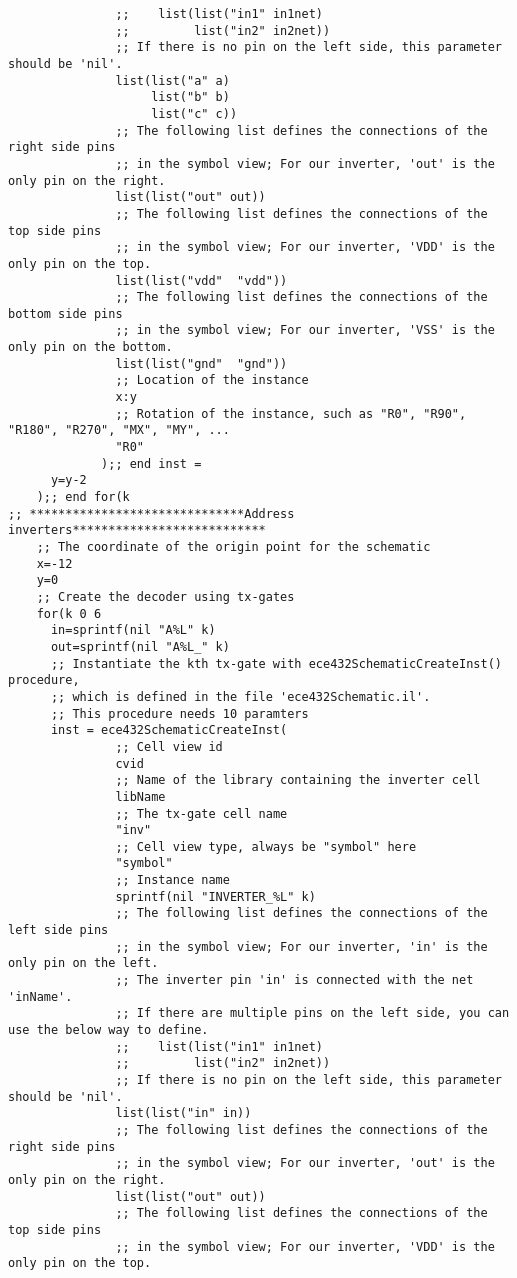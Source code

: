 \begin{lstlisting}
			   ;;    list(list("in1" in1net)
			   ;;         list("in2" in2net))
			   ;; If there is no pin on the left side, this parameter should be 'nil'.
	  		   list(list("a" a) 
			   		list("b" b)
			   		list("c" c))	   
			   ;; The following list defines the connections of the right side pins 
			   ;; in the symbol view; For our inverter, 'out' is the only pin on the right.
	  		   list(list("out" out)) 
			   ;; The following list defines the connections of the top side pins 
			   ;; in the symbol view; For our inverter, 'VDD' is the only pin on the top.
	  		   list(list("vdd"  "vdd")) 
			   ;; The following list defines the connections of the bottom side pins 
			   ;; in the symbol view; For our inverter, 'VSS' is the only pin on the bottom.
		       list(list("gnd"  "gnd"))   
			   ;; Location of the instance
	           x:y    
			   ;; Rotation of the instance, such as "R0", "R90", "R180", "R270", "MX", "MY", ...
			   "R0"
			 );; end inst =
	  y=y-2
	);; end for(k
;; ******************************Address inverters***************************
	;; The coordinate of the origin point for the schematic
    x=-12
    y=0	
	;; Create the decoder using tx-gates
	for(k 0 6
	  in=sprintf(nil "A%L" k)
	  out=sprintf(nil "A%L_" k)
	  ;; Instantiate the kth tx-gate with ece432SchematicCreateInst() procedure, 
	  ;; which is defined in the file 'ece432Schematic.il'. 
	  ;; This procedure needs 10 paramters
	  inst = ece432SchematicCreateInst(
		       ;; Cell view id
			   cvid 			   
			   ;; Name of the library containing the inverter cell
			   libName			   
		       ;; The tx-gate cell name  
	           "inv"  			   
			   ;; Cell view type, always be "symbol" here
			   "symbol" 			   
			   ;; Instance name
		       sprintf(nil "INVERTER_%L" k) 			   
			   ;; The following list defines the connections of the left side pins 
			   ;; in the symbol view; For our inverter, 'in' is the only pin on the left.
			   ;; The inverter pin 'in' is connected with the net 'inName'.
			   ;; If there are multiple pins on the left side, you can use the below way to define.
			   ;;    list(list("in1" in1net)
			   ;;         list("in2" in2net))
			   ;; If there is no pin on the left side, this parameter should be 'nil'.
	  		   list(list("in" in))			   
			   ;; The following list defines the connections of the right side pins 
			   ;; in the symbol view; For our inverter, 'out' is the only pin on the right.
	  		   list(list("out" out)) 
			   ;; The following list defines the connections of the top side pins 
			   ;; in the symbol view; For our inverter, 'VDD' is the only pin on the top.

\end{lstlisting}
